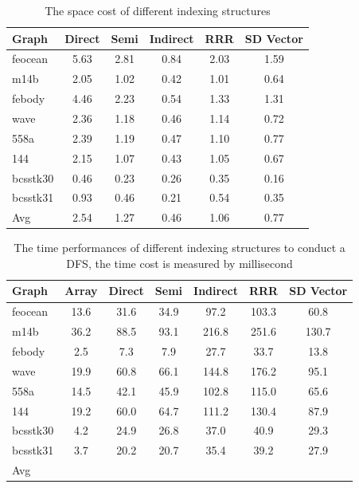 \documentclass[12pt,glossary]{dalthesis}
\begin{document}
\begin{table}[ht]
\centering
\caption{The space cost of different indexing structures}
\label{my-label}
\begin{tabular}{|l||c||c||c||c||c|}
\hline
Graph    & Direct & Semi & Indirect & RRR & SD Vector \\ \hline
feocean  &    5.63    &   2.81   &     0.84     &  2.03   &   1.59        \\
m14b     &    2.05    &   1.02   &    0.42      &  1.01   &   0.64        \\
febody   &    4.46   &   2.23   &     0.54     &  1.33   &    1.31        \\
wave     &   2.36    &   1.18   &    0.46      &   1.14   &   0.72         \\
558a     &    2.39    &   1.19   &   0.47       &  1.10   &    0.77       \\
144      &    2.15   &   1.07   &    0.43      &  1.05    &   0.67          \\
bcsstk30 &   0.46   &   0.23   &      0.26    &   0.35   &   0.16        \\
bcsstk31 &   0.93   &   0.46   &     0.21     &  0.54   &   0.35        \\ \hline
Avg      &    2.54   &   1.27   &     0.46     &  1.06   &    0.77       \\
\hline
\end{tabular}
\end{table}




\begin{table}[ht]
\centering
\caption{The time performances of different indexing structures to conduct a DFS, the time cost is measured by millisecond}
\label{my-label}
\begin{tabular}{|l||c||c||c||c||c||c|}
\hline
Graph    & Array & Direct & Semi & Indirect & RRR & SD Vector \\ \hline
feocean  &   13.6    &   31.6     &   34.9   &    97.2      &  103.3   & 60.8          \\
m14b     &   36.2    &    88.5    &   93.1   &   216.8   &  251.6   &   130.7        \\
febody   &   2.5    &    7.3    &   7.9   &     27.7    &   33.7  &     13.8      \\
wave     &    19.9   &    60.8    &   66.1   &    144.8     &   176.2  &   95.1        \\
558a     &    14.5   &    42.1    &   45.9   &    102.8     &  115.0   &    65.6       \\
144      &   19.2    &    60.0    &   64.7   &     111.2     &  130.4   &  87.9         \\
bcsstk30 &   4.2    &    24.9    &   26.8   &    37.0    &   40.9  &  29.3         \\
bcsstk31 &    3.7   &    20.2    &   20.7   &     35.4    &   39.2  &  27.9         \\ \hline
Avg      &       &        &      &          &     &           \\
\hline
\end{tabular}
\end{table}
\end{document}
